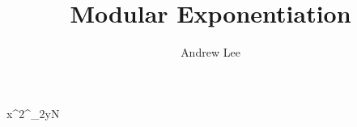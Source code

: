 \documentclass[10pt,a4paper,oneside]{article}
\begin{document}
\title{Modular Exponentiation}\author{Andrew Lee}\maketitle{}

x^{2^{\lfloor\log_{2}{y}\rfloor}}\mod N
\end{document}
